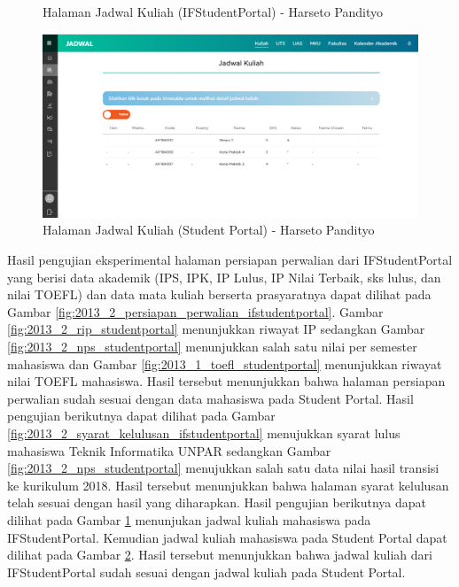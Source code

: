 \begin{itemize}
\begin{enumerate}
\begin{figure}[H]
			\caption{Halaman Jadwal Kuliah (IFStudentPortal) - Harseto Pandityo}
			\label{fig:2013_2_jadwal_kuliah_ifstudentportal}
		\end{figure}
		\begin{figure}[H]
			\centering
			\includegraphics[scale=0.45]{Gambar/HasilPengujian/2013_2_jadwal_kuliah_studentportal}
			\caption{Halaman Jadwal Kuliah (Student Portal) - Harseto Pandityo}
			\label{fig:2013_2_jadwal_kuliah_studentportal}
		\end{figure}
		Hasil pengujian eksperimental halaman persiapan perwalian dari IFStudentPortal yang berisi data akademik (IPS, IPK, IP Lulus, IP Nilai Terbaik, sks lulus, dan nilai TOEFL) dan data mata kuliah berserta prasyaratnya dapat dilihat pada Gambar \ref{fig:2013_2_persiapan_perwalian_ifstudentportal}. Gambar \ref{fig:2013_2_rip_studentportal} menunjukkan riwayat IP sedangkan Gambar \ref{fig:2013_2_nps_studentportal} menunjukkan salah satu nilai per semester mahasiswa dan Gambar \ref{fig:2013_1_toefl_studentportal} menunjukkan riwayat nilai TOEFL mahasiswa. Hasil tersebut menunjukkan bahwa halaman persiapan perwalian sudah sesuai dengan data mahasiswa pada Student Portal. Hasil pengujian berikutnya dapat dilihat pada Gambar \ref{fig:2013_2_syarat_kelulusan_ifstudentportal} menujukkan syarat lulus mahasiswa Teknik Informatika UNPAR sedangkan Gambar \ref{fig:2013_2_nps_studentportal} menujukkan salah satu data nilai hasil transisi ke kurikulum 2018. Hasil tersebut menunjukkan bahwa halaman syarat kelulusan telah sesuai dengan hasil yang diharapkan. Hasil pengujian berikutnya dapat dilihat pada Gambar \ref{fig:2013_2_jadwal_kuliah_ifstudentportal} menunjukan jadwal kuliah mahasiswa pada IFStudentPortal. Kemudian jadwal kuliah mahasiswa pada Student Portal dapat dilihat pada Gambar \ref{fig:2013_2_jadwal_kuliah_studentportal}. Hasil tersebut menunjukkan bahwa jadwal kuliah dari IFStudentPortal sudah sesuai dengan jadwal kuliah pada Student Portal.

\end{enumerate}
\end{itemize}
